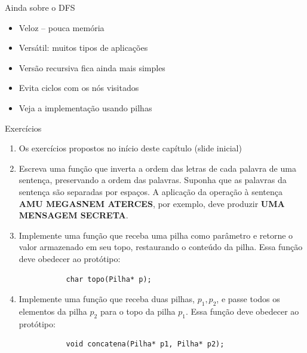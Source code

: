 \begin{frame}[c]{Ainda sobre o DFS} 

\begin{itemize}
  \item Veloz -- pouca memória
  \item Versátil: muitos tipos de aplicações
  \item Versão recursiva fica ainda mais simples
  \item Evita ciclos com os nós visitados 
  \item Veja a implementação usando pilhas
  
\end{itemize}

\end{frame}



\begin{frame}[fragile]{Exercícios}
	\begin{enumerate}
	
	\item Os exercícios propostos no início deste capítulo (slide inicial)
	
	
		\item Escreva uma função que inverta a ordem das letras de cada palavra de uma sentença, preservando a ordem das palavras. Suponha que as palavras da sentença são separadas por espaços. A aplicação da operação à sentença \textbf{AMU MEGASNEM ATERCES}, por exemplo, deve produzir \textbf{UMA MENSAGEM SECRETA}.
		\item Implemente uma função que receba uma pilha como parâmetro e retorne o valor armazenado em seu topo, restaurando o conteúdo da pilha. Essa função deve obedecer ao protótipo: 
		\begin{verbatim}
		   char topo(Pilha* p);
		\end{verbatim} 
		\item Implemente uma função que receba duas pilhas, $p_1, p_2$, e passe todos os elementos da pilha $p_2$ para o topo da pilha $p_1$. Essa função deve obedecer ao protótipo: 
		\begin{verbatim}
		   void concatena(Pilha* p1, Pilha* p2);
		\end{verbatim} 
	\end{enumerate}
\end{frame}
